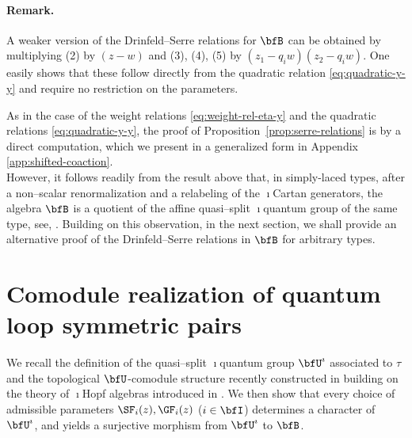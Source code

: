 \documentclass[reqno]{amsart}
\numberwithin{equation}{section}
\newenvironment{remark}{\medskip\paragraph{{\bf Remark.}}}{\par\medskip}
\begin{document}
\begin{remark}
A weaker version of the Drinfeld--Serre relations for $\bfB$ can be obtained by 	
multiplying (2) by $(z-w)$ and (3), (4), (5) by $(z_1-q_iw)(z_2-q_iw)$. 
One easily shows that these follow directly from the
quadratic relation \eqref{eq:quadratic-y-y} and require no restriction on the parameters.
\hfill\rmkend
\end{remark}

As in the case of the weight relations \eqref{eq:weight-rel-eta-y} and the quadratic 
relations \eqref{eq:quadratic-y-y}, the proof of Proposition~\ref{prop:serre-relations} is 
by a direct computation, which we present in a generalized form in Appendix 
\ref{app:shifted-coaction}.\\ 

However, it follows readily from the result above that, in simply-laced types, after a 
non--scalar renormalization and a relabeling of the $\imath$Cartan generators, the 
algebra $\bfB$ is a quotient of the affine quasi--split $\imath$quantum group of the same 
type, see, \eg \cite[Def. 2.1]{lu-wang-weekes-26}. Building on this observation, in the 
next section, we shall provide an alternative proof of the Drinfeld--Serre relations in 
$\bfB$ for arbitrary types. 


\section{Comodule realization of quantum loop symmetric pairs}
\label{s:comodule-realization}

We recall the definition of the quasi--split $\imath$quantum group $\bfU^\imath$ 
associated to $\tau$
and the topological $\bfU$-comodule structure  recently constructed in \cite{lu-pan-26} building on the theory of $\imath$Hopf algebras introduced in \cite{chen-pan-ruan-wang-25}.
We then show that  every choice of admissible parameters $\SF_i(z), \GF_i(z)$ ($i\in\bfI$) determines a character of $\bfU^\imath$, and yields a surjective morphism from $\bfU^\imath$ to $\bfB$.
\end{document}
